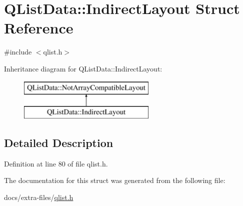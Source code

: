 \hypertarget{struct_q_list_data_1_1_indirect_layout}{}\section{Q\+List\+Data\+:\+:Indirect\+Layout Struct Reference}
\label{struct_q_list_data_1_1_indirect_layout}


{\ttfamily \#include $<$qlist.\+h$>$}

Inheritance diagram for Q\+List\+Data\+:\+:Indirect\+Layout\+:\begin{figure}[H]
\begin{center}
\leavevmode
\includegraphics[height=2.000000cm]{struct_q_list_data_1_1_indirect_layout}
\end{center}
\end{figure}


\subsection{Detailed Description}


Definition at line 80 of file qlist.\+h.



The documentation for this struct was generated from the following file\+:\begin{DoxyCompactItemize}
\item 
docs/extra-\/files/\hyperlink{qlist_8h}{qlist.\+h}\end{DoxyCompactItemize}
